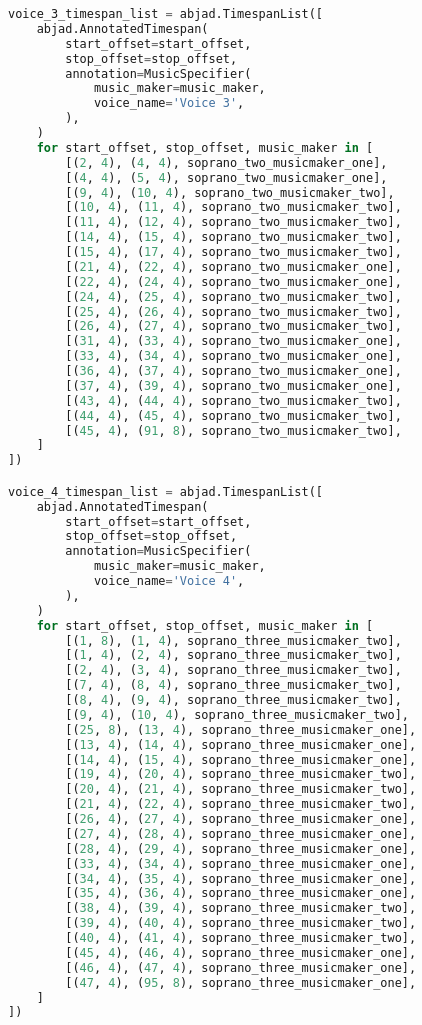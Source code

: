 \begin{lstlisting}[language=Python, caption=Invocation Source Code]
voice_3_timespan_list = abjad.TimespanList([
    abjad.AnnotatedTimespan(
        start_offset=start_offset,
        stop_offset=stop_offset,
        annotation=MusicSpecifier(
            music_maker=music_maker,
            voice_name='Voice 3',
        ),
    )
    for start_offset, stop_offset, music_maker in [
        [(2, 4), (4, 4), soprano_two_musicmaker_one],
        [(4, 4), (5, 4), soprano_two_musicmaker_one],
        [(9, 4), (10, 4), soprano_two_musicmaker_two],
        [(10, 4), (11, 4), soprano_two_musicmaker_two],
        [(11, 4), (12, 4), soprano_two_musicmaker_two],
        [(14, 4), (15, 4), soprano_two_musicmaker_two],
        [(15, 4), (17, 4), soprano_two_musicmaker_two],
        [(21, 4), (22, 4), soprano_two_musicmaker_one],
        [(22, 4), (24, 4), soprano_two_musicmaker_one],
        [(24, 4), (25, 4), soprano_two_musicmaker_two],
        [(25, 4), (26, 4), soprano_two_musicmaker_two],
        [(26, 4), (27, 4), soprano_two_musicmaker_two],
        [(31, 4), (33, 4), soprano_two_musicmaker_one],
        [(33, 4), (34, 4), soprano_two_musicmaker_one],
        [(36, 4), (37, 4), soprano_two_musicmaker_one],
        [(37, 4), (39, 4), soprano_two_musicmaker_one],
        [(43, 4), (44, 4), soprano_two_musicmaker_two],
        [(44, 4), (45, 4), soprano_two_musicmaker_two],
        [(45, 4), (91, 8), soprano_two_musicmaker_two],
    ]
])

voice_4_timespan_list = abjad.TimespanList([
    abjad.AnnotatedTimespan(
        start_offset=start_offset,
        stop_offset=stop_offset,
        annotation=MusicSpecifier(
            music_maker=music_maker,
            voice_name='Voice 4',
        ),
    )
    for start_offset, stop_offset, music_maker in [
        [(1, 8), (1, 4), soprano_three_musicmaker_two],
        [(1, 4), (2, 4), soprano_three_musicmaker_two],
        [(2, 4), (3, 4), soprano_three_musicmaker_two],
        [(7, 4), (8, 4), soprano_three_musicmaker_two],
        [(8, 4), (9, 4), soprano_three_musicmaker_two],
        [(9, 4), (10, 4), soprano_three_musicmaker_two],
        [(25, 8), (13, 4), soprano_three_musicmaker_one],
        [(13, 4), (14, 4), soprano_three_musicmaker_one],
        [(14, 4), (15, 4), soprano_three_musicmaker_one],
        [(19, 4), (20, 4), soprano_three_musicmaker_two],
        [(20, 4), (21, 4), soprano_three_musicmaker_two],
        [(21, 4), (22, 4), soprano_three_musicmaker_two],
        [(26, 4), (27, 4), soprano_three_musicmaker_one],
        [(27, 4), (28, 4), soprano_three_musicmaker_one],
        [(28, 4), (29, 4), soprano_three_musicmaker_one],
        [(33, 4), (34, 4), soprano_three_musicmaker_one],
        [(34, 4), (35, 4), soprano_three_musicmaker_one],
        [(35, 4), (36, 4), soprano_three_musicmaker_one],
        [(38, 4), (39, 4), soprano_three_musicmaker_two],
        [(39, 4), (40, 4), soprano_three_musicmaker_two],
        [(40, 4), (41, 4), soprano_three_musicmaker_two],
        [(45, 4), (46, 4), soprano_three_musicmaker_one],
        [(46, 4), (47, 4), soprano_three_musicmaker_one],
        [(47, 4), (95, 8), soprano_three_musicmaker_one],
    ]
])


\end{lstlisting}
